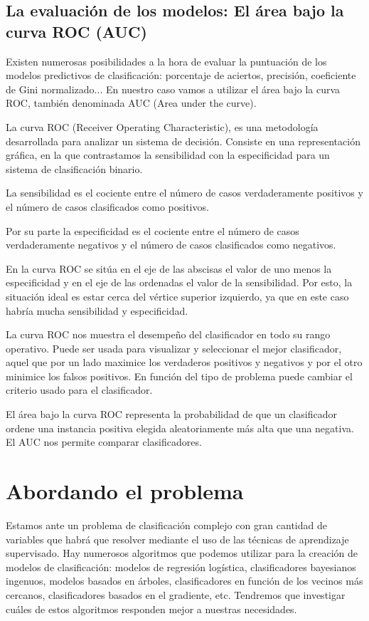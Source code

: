 \documentclass[11pt,a4paper,spanish]{article} %
\begin{document}
\subsection{La evaluación de los modelos: El área bajo la curva ROC (AUC)}

Existen numerosas posibilidades a la hora de evaluar la puntuación de los modelos predictivos de clasificación: porcentaje de aciertos, precisión, coeficiente de Gini normalizado... En nuestro caso vamos a utilizar el área bajo la curva ROC, también denominada AUC (Area under the curve). 

La curva ROC (Receiver Operating Characteristic), es una metodología desarrollada para analizar un sistema de decisión. Consiste en una representación gráfica, en la que contrastamos la sensibilidad con la especificidad para un sistema de clasificación binario. 

La sensibilidad es el cociente entre el número de casos verdaderamente positivos y el número de casos clasificados como positivos. 

Por su parte la especificidad es el cociente entre el número de casos verdaderamente negativos y el número de casos clasificados como negativos.

En la curva ROC se sitúa en el eje de las abscisas el valor de uno menos la especificidad y en el eje de las ordenadas el valor de la sensibilidad. Por esto, la situación ideal es estar cerca del vértice superior izquierdo, ya que en este caso habría mucha sensibilidad y especificidad.

La curva ROC nos muestra el desempeño del clasificador en todo su rango operativo. Puede ser usada para visualizar y seleccionar el mejor clasificador, aquel que por un lado maximice los verdaderos positivos y negativos y por el otro minimice los falsos positivos. En función del tipo de problema puede cambiar el criterio usado para el clasificador. 

El área bajo la curva ROC representa la probabilidad de que un clasificador ordene una instancia positiva elegida aleatoriamente más alta que una negativa. El AUC nos permite comparar clasificadores.

\newpage

\section{Abordando el problema}

Estamos ante un problema de clasificación complejo con gran cantidad de variables que habrá que resolver mediante el uso de las técnicas de aprendizaje supervisado. Hay numerosos algoritmos que podemos utilizar para la creación de modelos de clasificación: modelos de regresión logística, clasificadores bayesianos ingenuos, modelos basados en árboles, clasificadores en función de los vecinos más cercanos, clasificadores basados en el gradiente, etc. Tendremos que investigar cuáles de estos algoritmos responden mejor a nuestras necesidades.  
\end{document}
